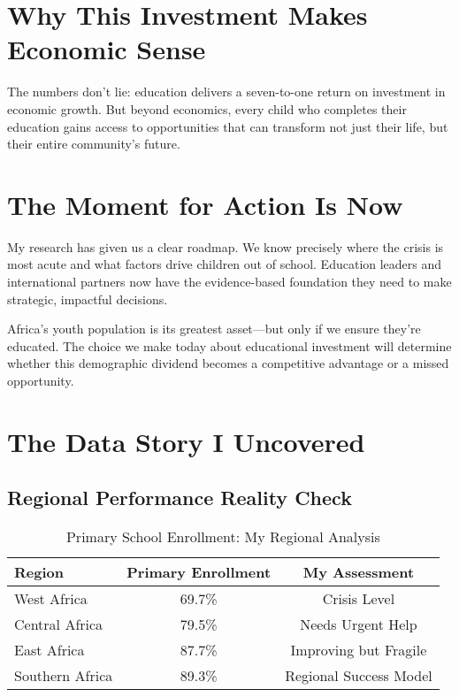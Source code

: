 \documentclass[12pt,a4paper]{article}
\begin{document}
\section{Why This Investment Makes Economic Sense}

The numbers don't lie: education delivers a seven-to-one return on investment in economic growth. But beyond economics, every child who completes their education gains access to opportunities that can transform not just their life, but their entire community's future.

\section{The Moment for Action Is Now}

My research has given us a clear roadmap. We know precisely where the crisis is most acute and what factors drive children out of school. Education leaders and international partners now have the evidence-based foundation they need to make strategic, impactful decisions.

Africa's youth population is its greatest asset---but only if we ensure they're educated. The choice we make today about educational investment will determine whether this demographic dividend becomes a competitive advantage or a missed opportunity.

\section{The Data Story I Uncovered}

\subsection{Regional Performance Reality Check}

\begin{table}[h]
\centering
\begin{tabular}{|l|c|c|}
\hline
\textbf{Region} & \textbf{Primary Enrollment} & \textbf{My Assessment} \\
\hline
West Africa & 69.7\% & Crisis Level \\
Central Africa & 79.5\% & Needs Urgent Help \\
East Africa & 87.7\% & Improving but Fragile \\
Southern Africa & 89.3\% & Regional Success Model \\
\hline
\end{tabular}
\caption{Primary School Enrollment: My Regional Analysis}
\end{table}
\end{document}
